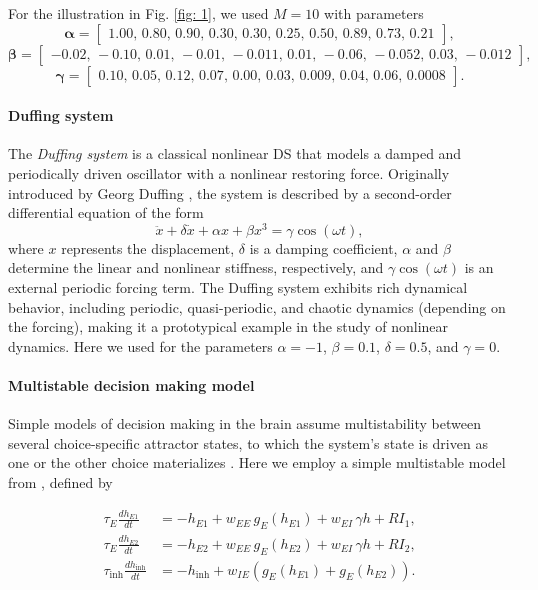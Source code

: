 \documentclass{article}
\theoremstyle{example}
\theoremstyle{plain}
\theoremstyle{definition}
\theoremstyle{remark}
\begin{document}
For the illustration in Fig. \ref{fig: 1}, we used $M=10$ with parameters
\[
\bm{\alpha} =
\begin{bmatrix}
1.00,\,0.80,\,0.90,\,0.30,\,0.30,\,0.25,\,0.50,\,0.89,\,0.73,\,0.21
\end{bmatrix},
\]
\[
\bm{\beta} =
\begin{bmatrix}
-0.02,\,-0.10,\,0.01,\,-0.01,\,-0.011,\,0.01,\,-0.06,\,-0.052,\,0.03,\,-0.012
\end{bmatrix},
\]
\[
\bm{\gamma} =
\begin{bmatrix}
0.10,\,0.05,\,0.12,\,0.07,\,0.00,\,0.03,\,0.009,\,0.04,\,0.06,\,0.0008
\end{bmatrix}.
\]

\color{black}
\paragraph{Duffing system}
\label{Sec: Duffing}
The \textit{Duffing system} is a classical nonlinear DS that models a damped and periodically driven oscillator with a nonlinear restoring force. Originally introduced by Georg Duffing \citep{duffing1918}, the system is described by a second-order differential equation of the form
\[
\ddot{x} + \delta \dot{x} + \alpha x + \beta x^3 = \gamma \cos(\omega t),
\]
where \(x\) represents the displacement, \(\delta\) is a damping coefficient, \(\alpha\) and \(\beta\) determine the linear and nonlinear stiffness, respectively, and \(\gamma \cos(\omega t)\) is an external periodic forcing term. The Duffing system exhibits rich dynamical behavior, including periodic, quasi-periodic, and chaotic dynamics (depending on the forcing), making it a prototypical example in the study of nonlinear dynamics. 
Here we used for the parameters $\alpha=-1$, $\beta=0.1$, $\delta=0.5$, and $\gamma=0$.

\paragraph{Multistable decision making model}
Simple models of decision making in the brain assume multistability between several choice-specific attractor states, to which the system's state is driven as one or the other choice materializes \citep{wang2002probabilistic}. Here we employ a simple multistable model from \cite{gerstner2014neuronal}, defined by

\begin{align}
    \tau_E \frac{d h_{E1}}{dt}
        &= - h_{E1}
           + w_{EE}\, g_E(h_{E1})
           + w_{EI}\, \gamma h
           + R I_1, \\[6pt]
    \tau_E \frac{d h_{E2}}{dt}
        &= - h_{E2}
           + w_{EE}\, g_E(h_{E2})
           + w_{EI}\,\gamma h
           + R I_2, \\[6pt]
    \tau_{\text{inh}} \frac{d h_{\text{inh}}}{dt}
        &= - h_{\text{inh}}
           + w_{IE}\!\left( g_E(h_{E1}) + g_E(h_{E2}) \right).
\end{align}
\end{document}
